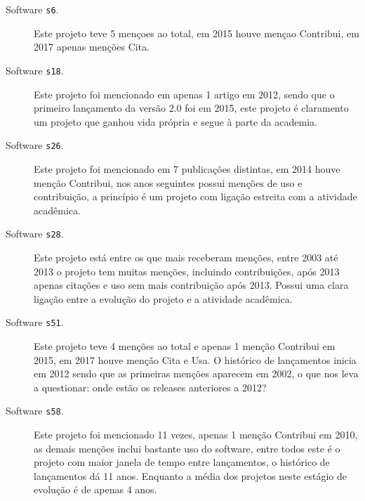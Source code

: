 \begin{description}

  \item[Software \texttt{s6}.]
    Este projeto teve 5 mençoes ao total, em 2015 houve mençao Contribui, em
    2017 apenas menções Cita.

  \item[Software \texttt{s18}.]
    Este projeto foi mencionado em apenas 1 artigo em 2012, sendo que o
    primeiro lançamento da versão 2.0 foi em 2015, este projeto é claramento um
    projeto que ganhou vida própria e segue à parte da academia.

  \item[Software \texttt{s26}.]
    Este projeto foi mencionado em 7 publicações distintas, em 2014 houve
    menção Contribui, nos anos seguintes possui menções de uso e contribuição,
    a princípio é um projeto com ligação estreita com a atividade acadêmica.

  \item[Software \texttt{s28}.]
    Este projeto está entre os que mais receberam menções, entre 2003 até 2013
    o projeto tem muitas menções, incluindo contribuições, após 2013 apenas
    citações e uso sem mais contribuição após 2013. Possui uma clara ligação
    entre a evolução do projeto e a atividade acadêmica.


  \item[Software \texttt{s51}.]
    Este projeto teve 4 menções ao total e apenas 1 menção Contribui em 2015,
    em 2017 houve menção Cita e Usa. O histórico de lançamentos inicia em 2012
    sendo que as primeiras menções aparecem em 2002, o que nos leva a
    questionar: onde estão os releases anteriores a 2012?

  \item[Software \texttt{s58}.]
    Este projeto foi mencionado 11 vezes, apenas 1 menção Contribui em 2010, as
    demais menções inclui bastante uso do software, entre todos este é o
    projeto com maior janela de tempo entre lançamentos, o histórico de
    lançamentos dá 11 anos. Enquanto a média dos projetos neste estágio de evolução
    é de apenas 4 anos.


\end{description}


